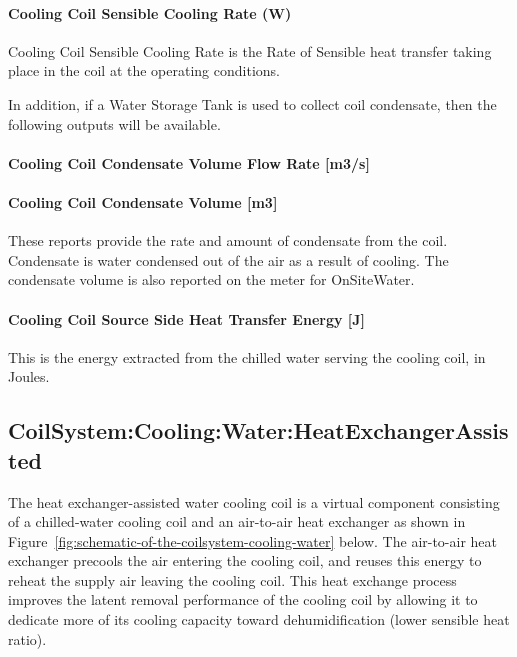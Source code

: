 \paragraph{Cooling Coil Sensible Cooling Rate (W)}\label{cooling-coil-sensible-cooling-rate-w-3}

Cooling Coil Sensible Cooling Rate is the Rate of Sensible heat transfer taking place in the coil at the operating conditions.

In addition, if a Water Storage Tank is used to collect coil condensate, then the following outputs will be available.

\paragraph{Cooling Coil Condensate Volume Flow Rate {[}m3/s{]}}\label{cooling-coil-condensate-volume-flow-rate-m3s-3}

\paragraph{Cooling Coil Condensate Volume {[}m3{]}}\label{cooling-coil-condensate-volume-m3-3}

These reports provide the rate and amount of condensate from the coil. Condensate is water condensed out of the air as a result of cooling. The condensate volume is also reported on the meter for OnSiteWater.

\paragraph{Cooling Coil Source Side Heat Transfer Energy {[}J{]}}\label{cooling-coil-source-side-heat-transfer-energy-j-1}

This is the energy extracted from the chilled water serving the cooling coil, in Joules.

\subsection{CoilSystem:Cooling:Water:HeatExchangerAssisted}\label{coilsystemcoolingwaterheatexchangerassisted}

The heat exchanger-assisted water cooling coil is a virtual component consisting of a chilled-water cooling coil and an air-to-air heat exchanger as shown in Figure~\ref{fig:schematic-of-the-coilsystem-cooling-water} below. The air-to-air heat exchanger precools the air entering the cooling coil, and reuses this energy to reheat the supply air leaving the cooling coil. This heat exchange process improves the latent removal performance of the cooling coil by allowing it to dedicate more of its cooling capacity toward dehumidification (lower sensible heat ratio).

